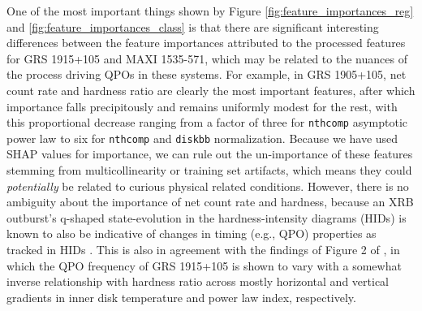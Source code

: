 \documentclass[fleqn,usenatbib,twocolumn]{mnras}%
\begin{document}
One of the most important things shown by Figure \ref{fig:feature_importances_reg} and \ref{fig:feature_importances_class} is that there are significant interesting differences between the feature importances attributed to the processed features for GRS 1915+105 and MAXI 1535-571, which may be related to the nuances of the process driving QPOs in these systems. For example, in GRS 1905+105, net count rate and hardness ratio are clearly the most important features, after which importance falls precipitously and remains uniformly modest for the rest, with this proportional decrease ranging from a factor of three for \texttt{nthcomp} asymptotic power law to six for \texttt{nthcomp} and \texttt{diskbb} normalization. Because we have used SHAP values for importance, we can rule out the un-importance of these features stemming from multicollinearity or training set artifacts, which means they could \textit{potentially} be related to curious physical related conditions. However, there is no ambiguity about the importance of net count rate and hardness, because an XRB outburst's q-shaped state-evolution in the hardness-intensity diagrams (HIDs) is known to also be indicative of changes in timing (e.g., QPO) properties as tracked in HIDs \citep{motta2015LotsofQPOs,mottaquickreview}. This is also in agreement with the findings of Figure 2 of \cite{evolvingPropertiesGRSCorona}, in which the QPO frequency of GRS 1915+105 is shown to vary with a somewhat inverse relationship with hardness ratio across mostly horizontal and vertical gradients in inner disk temperature and power law index, respectively. %
\end{document}
